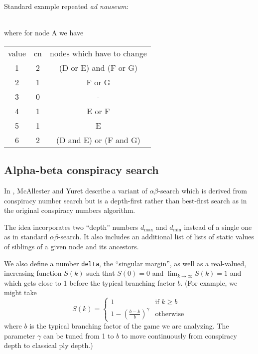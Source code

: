 \documentclass[10pt,dvipdfmx]{report}
\newcommand{\ab}{{$\alpha\beta$}}
\begin{document}
Standard example repeated {\it ad nauseum}:
\begin{center}
\\\noindent
where for node A we have
\\\noindent
\begin{tabular}{ccc}
  value & cn & nodes which have to change \\
  1 & 2 & (D or E) and (F or G) \\
  2 & 1 & F or G \\
  3 & 0 & - \\
  4 & 1 & E or F \\
  5 & 1 & E \\
  6 & 2 & (D and E) or (F and G)
\end{tabular}
\end{center}

\subsection{Alpha-beta conspiracy search}

In \cite{alphabetaconspiracy}, McAllester and Yuret describe a variant of \ab-search
which is derived from conspiracy number search but is a depth-first rather than best-first search
as in the original conspiracy numbers algorithm.

The idea incorporates two ``depth'' numbers $d_{\max}$ and $d_{\min}$ instead of a single one as in
standard \ab-search.  It also includes an additional list of lists of static values of siblings of
a given node and its ancestors.

We also define a number \verb|delta|, the ``singular margin'', as well as a real-valued, increasing function
$S(k)$ such that $S(0)=0$ and $\lim_{k\to\infty}S(k)=1$ and which gets close to 1 before the typical
branching factor $b$.  (For example, we might take
\[ S(k) = \begin{cases}1&\text{if $k\geq b$}\\1-\left(\frac{b-k}{b}\right)^\gamma&\text{otherwise}\end{cases}\]
where $b$ is the typical branching factor of the game we are analyzing.
The parameter $\gamma$ can be tuned from 1 to $b$ to move continuously from conspiracy depth to classical
ply depth.)
\end{document}
